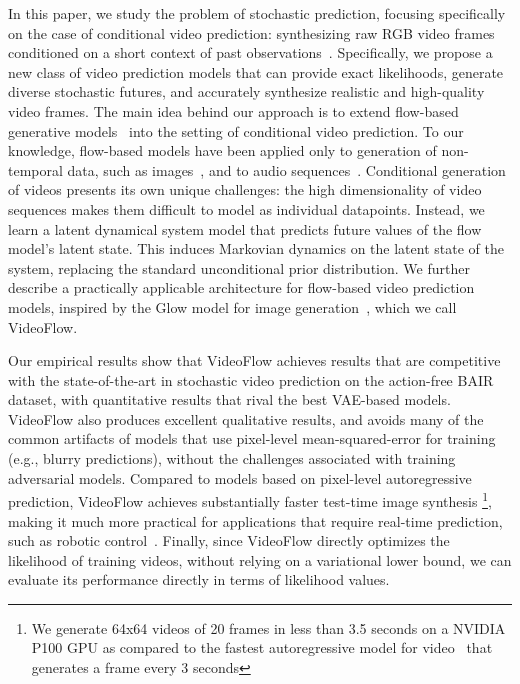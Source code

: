 \documentclass{article} \usepackage{iclr2020_conference,times}
\begin{document}
In this paper, we study the problem of stochastic prediction, focusing specifically on the case of conditional video prediction: synthesizing raw RGB video frames conditioned on a short context of past observations~\citep{ranzato2014video, srivastava2015unsupervised,vondrick2015anticipating,xingjian2015convolutional,boots2014learning}. Specifically, we propose a new class of video prediction models that can provide exact likelihoods, generate diverse stochastic futures, and accurately synthesize realistic and high-quality video frames. The main idea behind our approach is to extend flow-based generative models~\citep{dinh2014nice,dinh2016density} into the setting of conditional video prediction. To our knowledge, flow-based models have been applied only to generation of non-temporal data, such as images~\citep{kingma2018glow}, and to audio sequences~\citep{waveglow2018}. Conditional generation of videos presents its own unique challenges: the high dimensionality of video sequences makes them difficult to model as individual datapoints. Instead, we learn a latent dynamical system model that predicts future values of the flow model's latent state. This induces Markovian dynamics on the latent state of the system, replacing the standard unconditional prior distribution. We further describe a practically applicable architecture for flow-based video prediction models, inspired by the Glow model for image generation~\citep{kingma2018glow}, which we call VideoFlow.

Our empirical results show that VideoFlow achieves results that are competitive with the state-of-the-art in stochastic video prediction on the action-free BAIR dataset, with quantitative results that rival the best VAE-based models. VideoFlow also produces excellent qualitative results, and avoids many of the common artifacts of models that use pixel-level mean-squared-error for training (e.g., blurry predictions), without the challenges associated with training adversarial models. Compared to models based on pixel-level autoregressive prediction, VideoFlow achieves substantially faster test-time image synthesis \footnote{We generate 64x64 videos of 20 frames in less than 3.5 seconds on a NVIDIA P100 GPU as compared to the fastest autoregressive model for video~\citep{reed2017parallel} that generates a frame every 3 seconds}, making it much more practical for applications that require real-time prediction, such as robotic control~\citep{finn2017deep}. Finally, since VideoFlow directly optimizes the likelihood of training videos, without relying on a variational lower bound, we can evaluate its performance directly in terms of likelihood values.
\end{document}
